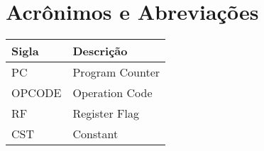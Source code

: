   \section{Acrônimos e Abreviações}
    \FloatBarrier
    \begin{table}[H]
      \begin{center}
        \begin{tabular}[pos]{|m{2cm} | m{12cm}|} 
          \hline
          \cellcolor[gray]{0.9}\textbf{Sigla} & \cellcolor[gray]{0.9}\textbf{Descrição} \\ \hline
          PC      &  Program Counter  \\ \hline
          OPCODE  &  Operation Code  \\ \hline
          RF  &  Register Flag  \\ \hline
          CST  &  Constant  \\ \hline
        \end{tabular}
      \end{center}
    \end{table}  
